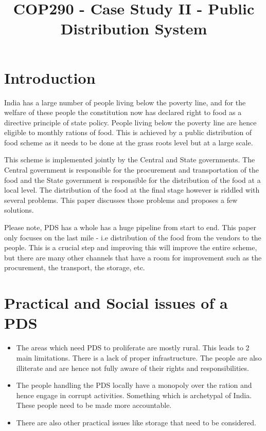 \documentclass[a4paper,11pt]{article}
\title{COP290 - Case Study II - Public Distribution System}
\author{N. Akash \\ \href{iakash2702@gmail.com}}
\begin{document}
\maketitle

\section{Introduction}
India has a large number of people living below the poverty line, and for the welfare of these people the constitution now has declared right to food as a directive principle of state policy. People living below the poverty line are hence eligible to monthly rations of food. This is achieved by a public distribution of food scheme as it needs to be done at the grass roots level but at a large scale. 

This scheme is implemented jointly by the Central and State governments. The Central government is responsible for the procurement and transportation of the food and the State government is responsible for the distribution of the food at a local level.  The distribution of the food at the final stage however is riddled with several problems. This paper discusses those problems and proposes a few solutions. 

Please note, PDS has a whole has a huge pipeline from start to end. This paper only focuses on the last mile - i.e distribution of the food from the vendors to the people. This is a crucial step and improving this will improve the entire scheme, but there are many other channels that have a room for improvement such as the procurement, the transport, the storage, etc. 

\section{Practical and Social issues of a PDS}
\begin{itemize}
    \item The areas which need PDS to proliferate are mostly rural. This leads to 2 main limitations. There is a lack of proper infrastructure. The people are also illiterate and are hence not fully aware of their rights and responsibilities. 
    
    \item The people handling the PDS locally have a monopoly over the ration and hence engage in corrupt activities. Something which is archetypal of India. These people need to be made more accountable. 
    
    \item There are also other practical issues like storage that need to be considered. 
\end{itemize}
\end{document}
